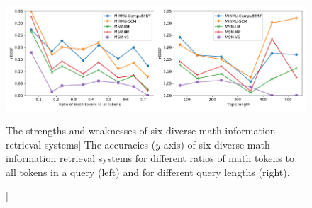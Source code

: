 \begin{figure}
\hspace*{-0.1\columnwidth}
\includegraphics[width=1.2\columnwidth]{strengths-and-weaknesses}
\vspace{-0.8cm}
\caption
  [The strengths and weaknesses of six diverse math information retrieval systems]%
  {The accuracies ($y$-axis) of six diverse math information retrieval systems
   for different ratios of math tokens to all tokens in a query (left)
   and for different query lengths (right). \cite[Figure 8]{novotny2021ensembling}}
\label{fig:strengths-and-weaknesses}
\end{figure}